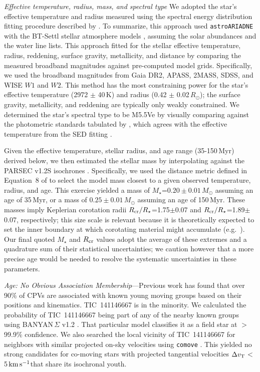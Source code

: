 \documentclass{nature3}
\newcommand{\kms}{\ensuremath{\rm km\,s^{-1}}}
\begin{document}
\begin{methods}
{\it Effective temperature, radius, mass, and spectral type}
We adopted the star's effective temperature and radius measured using
the spectral energy distribution fitting procedure described by
\cite{Bouma2024}.  To summarize, this approach used
\texttt{astroARIADNE} \cite{Vines2022} with the BT-Settl stellar
atmosphere models \cite{Allard2012}, assuming the \cite{Asplund2009}
solar abundances and the \cite{Barber2006} water line lists.  This
approach fitted for the stellar effective temperature, radius,
reddening, surface gravity, metallicity, and distance by comparing the
measured broadband magnitudes against pre-computed model grids.
Specifically, we used the broadband magnitudes from Gaia DR2, APASS,
2MASS, SDSS, and WISE $W1$ and $W2$.  This method has the most
constraining power for the star's effective temperature (2972 $\pm$
40\,K) and radius (0.42 $\pm$ 0.02\,$R_\odot$); the surface gravity,
metallicity, and reddening are typically only weakly constrained.  We
determined the star's spectral type to be M5.5Ve by visually comparing
against the photometric standards tabulated by \cite{Bochanski2007},
which agrees with the effective temperature from the SED fitting
\cite{Pecaut2013}.

Given the effective temperature, stellar radius, and age range
(35-150\,Myr) derived below, we then estimated the stellar mass by
interpolating against the PARSEC v1.2S isochrones \cite{Chen2014}.
Specifically, we used the distance metric defined in Equation~8 of
\cite{Bouma2024} to select the model mass closest to a given observed
temperature, radius, and age.  This exercise yielded a mass of
$M_\star$=$0.20\pm0.01$\,$M_\odot$ assuming an age of 35\,Myr, or a mass
of $0.25\pm0.01$\,$M_\odot$ assuming an age of 150\,Myr.  These masses
imply Keplerian corotation radii $R_{\rm cr}/R_\star$=1.75$\pm$0.07 and
$R_{\rm cr}/R_\star$=1.89$\pm$0.07, respectively; this size scale is
relevant because it is theoretically expected to set the inner boundary
at which corotating material might accumulate
(e.g.~\cite{Townsend2005,Daley-Yates2024}).  Our final quoted $M_\star$
and $R_{\rm cr}$ values adopt the average of these extremes and a
quadrature sum of their statistical uncertainties; we caution however
that a more precise age would be needed to resolve the systematic
uncertainties in these parameters.


{\it Age: No Obvious Association Membership}---Previous work
\cite{Bouma2024} has found that over 90\% of CPVs are associated with
known young moving groups based on their positions and kinematics.
TIC~141146667 is in the minority.  We calculated the probability of
TIC~141146667 being part of any of the nearby known groups using
BANYAN\,$\Sigma$ v1.2 \cite{Gagne2018}.  That particular model
classifies it as a field star at $>$99.9\% confidence.  We also searched
the local vicinity of TIC~141146667 for neighbors with similar projected
on-sky velocities using \texttt{comove} \cite{Tofflemire2021}.  This
yielded no strong candidates for co-moving stars with projected
tangential velocities $\Delta v_{\rm T}$$<$5\,\kms that share its
isochronal youth.


\end{methods}
\end{document}
